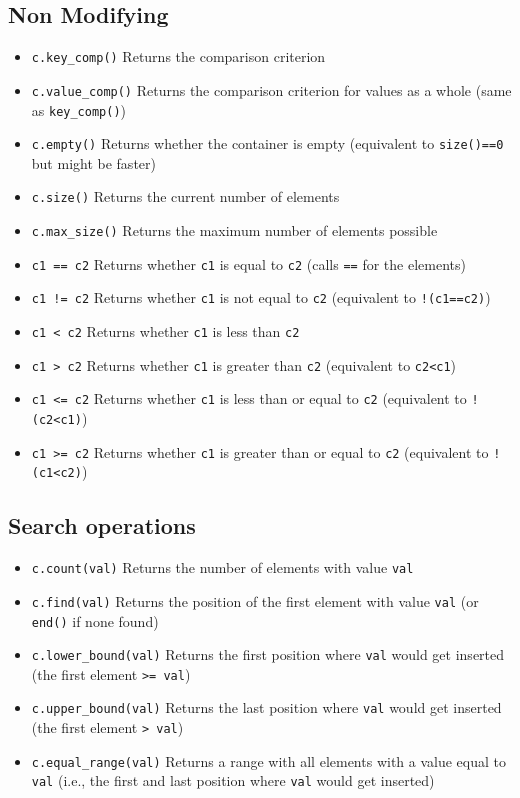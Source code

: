 \documentclass{report}
\begin{document}
\bigbreak \noindent 
\subsection{Non Modifying}
\begin{itemize}
    \item \texttt{c.key\_comp()} Returns the comparison criterion
    \item \texttt{c.value\_comp()} Returns the comparison criterion for values as a whole (same as \texttt{key\_comp()})
    \item \texttt{c.empty()} Returns whether the container is empty (equivalent to \texttt{size()==0} but might be faster)
    \item \texttt{c.size()} Returns the current number of elements
    \item \texttt{c.max\_size()} Returns the maximum number of elements possible
    \item \texttt{c1 == c2} Returns whether \texttt{c1} is equal to \texttt{c2} (calls \texttt{==} for the elements)
    \item \texttt{c1 != c2} Returns whether \texttt{c1} is not equal to \texttt{c2} (equivalent to \texttt{!(c1==c2)})
    \item \texttt{c1 < c2} Returns whether \texttt{c1} is less than \texttt{c2}
    \item \texttt{c1 > c2} Returns whether \texttt{c1} is greater than \texttt{c2} (equivalent to \texttt{c2<c1})
    \item \texttt{c1 <= c2} Returns whether \texttt{c1} is less than or equal to \texttt{c2} (equivalent to \texttt{!(c2<c1)})
    \item \texttt{c1 >= c2} Returns whether \texttt{c1} is greater than or equal to \texttt{c2} (equivalent to \texttt{!(c1<c2)})
\end{itemize}
\bigbreak \noindent 
\subsection{Search operations}
\begin{itemize}
    \item \texttt{c.count(val)} Returns the number of elements with value \texttt{val}
    \item \texttt{c.find(val)} Returns the position of the first element with value \texttt{val} (or \texttt{end()} if none found)
    \item \texttt{c.lower\_bound(val)} Returns the first position where \texttt{val} would get inserted (the first element \texttt{>= val})
    \item \texttt{c.upper\_bound(val)} Returns the last position where \texttt{val} would get inserted (the first element \texttt{> val})
    \item \texttt{c.equal\_range(val)} Returns a range with all elements with a value equal to \texttt{val} (i.e., the first and last position where \texttt{val} would get inserted)
\end{itemize}
\end{document}
